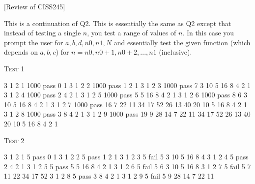 [Review of CISS245]

This is a continuation of Q2.
This is essentially the same as Q2 except that instead of testing a single 
$n$, you test a range of values
of $n$. 
In this case you prompt the user for $a, b, d, n0, n1, N$ and
essentially test the given function
(which depends on $a, b, c$) for $n = n0, n0+1, n0+2, ..., n1$ (inclusive).

\textsc{Test 1}
\begin{console}[frame=single,fontsize=\footnotesize, commandchars=\\\{\}]
3 1 2 1 1000 pass 0 1
3 1 2 2 1000 pass 1 2 1
3 1 2 3 1000 pass 7 3 10 5 16 8 4 2 1
3 1 2 4 1000 pass 2 4 2 1
3 1 2 5 1000 pass 5 5 16 8 4 2 1
3 1 2 6 1000 pass 8 6 3 10 5 16 8 4 2 1
3 1 2 7 1000 pass 16 7 22 11 34 17 52 26 13 40 20 10 5 16 8 4 2 1
3 1 2 8 1000 pass 3 8 4 2 1
3 1 2 9 1000 pass 19 9 28 14 7 22 11 34 17 52 26 13 40 20 10 5 16 8 4 2 1
\end{console}

\textsc{Test 2}
\begin{console}[frame=single,fontsize=\footnotesize, commandchars=\\\{\}]
3 1 2 1 5 pass 0 1
3 1 2 2 5 pass 1 2 1
3 1 2 3 5 fail 5 3 10 5 16 8 4
3 1 2 4 5 pass 2 4 2 1
3 1 2 5 5 pass 5 5 16 8 4 2 1
3 1 2 6 5 fail 5 6 3 10 5 16 8
3 1 2 7 5 fail 5 7 11 22 34 17 52
3 1 2 8 5 pass 3 8 4 2 1
3 1 2 9 5 fail 5 9 28 14 7 22 11
\end{console}
